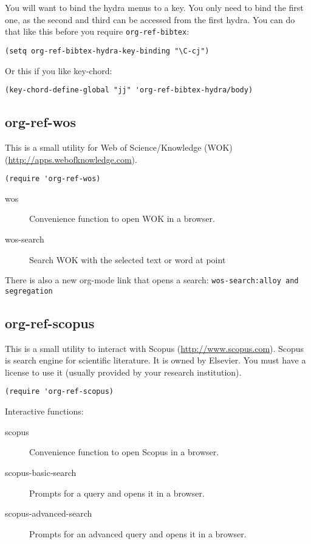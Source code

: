 \documentclass[11pt]{article}
\begin{document}
{You will want to bind the hydra menus to a key. You only need to bind the first one, as the second and third can be accessed from the first hydra. You can do that like this before you require \verb~org-ref-bibtex~:

\begin{verbatim}
(setq org-ref-bibtex-hydra-key-binding "\C-cj")
\end{verbatim}

Or this if you like key-chord:

\begin{verbatim}
(key-chord-define-global "jj" 'org-ref-bibtex-hydra/body)
\end{verbatim}

\subsection{org-ref-wos}
\label{sec-2-3}
This is a small utility for Web of Science/Knowledge (WOK) (\url{http://apps.webofknowledge.com}).

\begin{verbatim}
(require 'org-ref-wos)
\end{verbatim}

\begin{description}
\item[{wos}] Convenience function to open WOK in a browser.
\item[{wos-search}] Search WOK with the selected text or word at point
\end{description}

There is also a new org-mode link that opens a search: \texttt{wos-search:alloy and segregation}

\subsection{org-ref-scopus}
\label{sec-2-4}
This is a small utility to interact with Scopus (\url{http://www.scopus.com}). Scopus is search engine for scientific literature. It is owned by Elsevier. You must have a license to use it (usually provided by your research institution).

\begin{verbatim}
(require 'org-ref-scopus)
\end{verbatim}

Interactive functions:

\begin{description}
\item[{scopus}] Convenience function to open Scopus in a browser.
\item[{scopus-basic-search}] Prompts for a query and opens it in a browser.
\item[{scopus-advanced-search}] Prompts for an advanced query and opens it in a browser.
\end{description}

}
\end{document}
